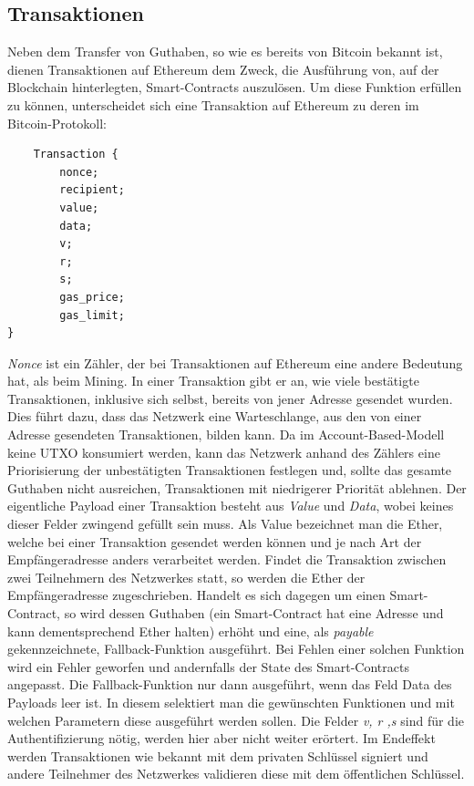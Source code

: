 \subsection{Transaktionen}
Neben dem Transfer von Guthaben, so wie es bereits von Bitcoin bekannt ist, dienen Transaktionen auf Ethereum dem Zweck, die Ausführung von, auf der Blockchain hinterlegten, Smart-Contracts auszulösen.
Um diese Funktion erfüllen zu können, unterscheidet sich eine Transaktion auf Ethereum zu deren im Bitcoin-Protokoll:
\begin{lstlisting}
	Transaction {
		nonce;
		recipient;
		value;
		data;
		v;
		r;
		s;	
		gas_price;
		gas_limit;
}
\end{lstlisting}
\emph{Nonce} ist ein Zähler, der bei Transaktionen auf Ethereum eine andere Bedeutung hat, als beim Mining. In einer Transaktion gibt er an, wie viele bestätigte Transaktionen, inklusive sich selbst, bereits von jener Adresse gesendet wurden. Dies führt dazu, dass das Netzwerk eine Warteschlange, aus den von einer Adresse gesendeten Transaktionen, bilden kann. Da im Account-Based-Modell keine UTXO konsumiert werden, kann das Netzwerk anhand des Zählers eine Priorisierung der unbestätigten Transaktionen festlegen und, sollte das gesamte Guthaben nicht ausreichen, Transaktionen mit niedrigerer Priorität ablehnen.
Der eigentliche Payload einer Transaktion besteht aus \emph{Value} und \emph{Data}, wobei keines dieser Felder zwingend gefüllt sein muss.
Als Value bezeichnet man die Ether, welche bei einer Transaktion gesendet werden können und je nach Art der Empfängeradresse anders verarbeitet werden. Findet die Transaktion zwischen zwei Teilnehmern des Netzwerkes statt, so werden die Ether der Empfängeradresse zugeschrieben. Handelt es sich dagegen um einen Smart-Contract, so wird dessen Guthaben (ein Smart-Contract hat eine Adresse und kann dementsprechend Ether halten) erhöht und eine, als \emph{payable} gekennzeichnete, Fallback-Funktion ausgeführt. Bei Fehlen einer solchen Funktion wird ein Fehler geworfen und andernfalls der State des Smart-Contracts angepasst.
Die Fallback-Funktion nur dann ausgeführt, wenn das Feld Data des Payloads leer ist. In diesem selektiert man die gewünschten Funktionen und mit welchen Parametern diese ausgeführt werden sollen. Die Felder \emph{v, r ,s} sind für die Authentifizierung nötig, werden hier aber nicht weiter erörtert. Im Endeffekt werden Transaktionen wie bekannt mit dem privaten Schlüssel signiert und andere Teilnehmer des Netzwerkes validieren diese mit dem öffentlichen Schlüssel.\\
